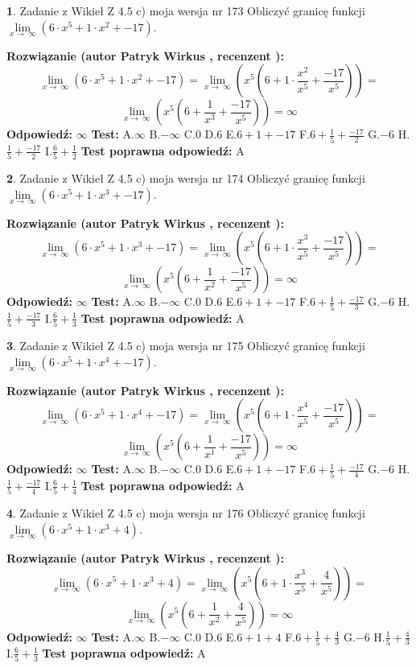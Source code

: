 \documentclass[12pt, a4paper]{article}
\theoremstyle{definition} %
\newtheorem{zad}{}
\newcommand{\zadStart}[1]{\begin{zad}#1\newline}
\newcommand{\zadStop}{\end{zad}}
\newcommand{\rozwStart}[2]{\noindent \textbf{Rozwiązanie (autor #1 , recenzent #2): }\newline}
\newcommand{\rozwStop}{\newline}
\newcommand{\odpStart}{\noindent \textbf{Odpowiedź:}\newline}
\newcommand{\odpStop}{\newline}
\newcommand{\testStart}{\noindent \textbf{Test:}\newline}
\newcommand{\testStop}{\newline}
\newcommand{\kluczStart}{\noindent \textbf{Test poprawna odpowiedź:}\newline}
\newcommand{\kluczStop}{\newline}
\begin{document}
\zadStart{Zadanie z Wikieł Z 4.5 c) moja wersja nr 173}
Obliczyć granicę funkcji  $\lim\limits_{x\to\ \infty}(6 \cdot x^{5}+1 \cdot x^{2}+-17)$.
\zadStop
\rozwStart{Patryk Wirkus}{}
$$\lim\limits_{x\to\ \infty}(6 \cdot x^{5}+1 \cdot x^{2}+-17) = \lim\limits_{x\to\ \infty}(x^{5}(6 +1 \cdot \frac{x^{2}}{x^{5}}+\frac{-17}{x^{5}})) =$$ $$\lim\limits_{x\to\ \infty}(x^{5}(6 +\frac{1}{x^{3}}+\frac{-17}{x^{5}})) =\infty$$
\rozwStop
\odpStart
$\infty$
\odpStop
\testStart
A.$\infty$ B.$-\infty$ C.$0$ D.$6$ E.$6 + 1 + -17$
F.$6+\frac{1}{5}+\frac{-17}{2}$ G.$-6$
H.$\frac{1}{5}+\frac{-17}{2}$
I.$\frac{6}{5}+\frac{1}{2}$
\testStop
\kluczStart
A
\kluczStop



\zadStart{Zadanie z Wikieł Z 4.5 c) moja wersja nr 174}
Obliczyć granicę funkcji  $\lim\limits_{x\to\ \infty}(6 \cdot x^{5}+1 \cdot x^{3}+-17)$.
\zadStop
\rozwStart{Patryk Wirkus}{}
$$\lim\limits_{x\to\ \infty}(6 \cdot x^{5}+1 \cdot x^{3}+-17) = \lim\limits_{x\to\ \infty}(x^{5}(6 +1 \cdot \frac{x^{3}}{x^{5}}+\frac{-17}{x^{5}})) =$$ $$\lim\limits_{x\to\ \infty}(x^{5}(6 +\frac{1}{x^{2}}+\frac{-17}{x^{5}})) =\infty$$
\rozwStop
\odpStart
$\infty$
\odpStop
\testStart
A.$\infty$ B.$-\infty$ C.$0$ D.$6$ E.$6 + 1 + -17$
F.$6+\frac{1}{5}+\frac{-17}{3}$ G.$-6$
H.$\frac{1}{5}+\frac{-17}{3}$
I.$\frac{6}{5}+\frac{1}{3}$
\testStop
\kluczStart
A
\kluczStop



\zadStart{Zadanie z Wikieł Z 4.5 c) moja wersja nr 175}
Obliczyć granicę funkcji  $\lim\limits_{x\to\ \infty}(6 \cdot x^{5}+1 \cdot x^{4}+-17)$.
\zadStop
\rozwStart{Patryk Wirkus}{}
$$\lim\limits_{x\to\ \infty}(6 \cdot x^{5}+1 \cdot x^{4}+-17) = \lim\limits_{x\to\ \infty}(x^{5}(6 +1 \cdot \frac{x^{4}}{x^{5}}+\frac{-17}{x^{5}})) =$$ $$\lim\limits_{x\to\ \infty}(x^{5}(6 +\frac{1}{x^{1}}+\frac{-17}{x^{5}})) =\infty$$
\rozwStop
\odpStart
$\infty$
\odpStop
\testStart
A.$\infty$ B.$-\infty$ C.$0$ D.$6$ E.$6 + 1 + -17$
F.$6+\frac{1}{5}+\frac{-17}{4}$ G.$-6$
H.$\frac{1}{5}+\frac{-17}{4}$
I.$\frac{6}{5}+\frac{1}{4}$
\testStop
\kluczStart
A
\kluczStop



\zadStart{Zadanie z Wikieł Z 4.5 c) moja wersja nr 176}
Obliczyć granicę funkcji  $\lim\limits_{x\to\ \infty}(6 \cdot x^{5}+1 \cdot x^{3}+4)$.
\zadStop
\rozwStart{Patryk Wirkus}{}
$$\lim\limits_{x\to\ \infty}(6 \cdot x^{5}+1 \cdot x^{3}+4) = \lim\limits_{x\to\ \infty}(x^{5}(6 +1 \cdot \frac{x^{3}}{x^{5}}+\frac{4}{x^{5}})) =$$ $$\lim\limits_{x\to\ \infty}(x^{5}(6 +\frac{1}{x^{2}}+\frac{4}{x^{5}})) =\infty$$
\rozwStop
\odpStart
$\infty$
\odpStop
\testStart
A.$\infty$ B.$-\infty$ C.$0$ D.$6$ E.$6 + 1 + 4$
F.$6+\frac{1}{5}+\frac{4}{3}$ G.$-6$
H.$\frac{1}{5}+\frac{4}{3}$
I.$\frac{6}{5}+\frac{1}{3}$
\testStop
\kluczStart
A
\kluczStop
\end{document}
